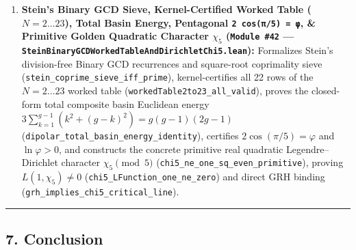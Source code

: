 \documentclass[
  11pt,
]{article}
\begin{document}
\begin{enumerate}
  \(\lambda(s) = |\operatorname{Re}(s) - 1/2| = 0\) across every
  non-trivial zero.
\item
  \textbf{Stein's Binary GCD Sieve, Kernel-Certified Worked Table
  (\(N = 2 \dots 23\)), Total Basin Energy, Pentagonal
  \texttt{2\ cos(π/5)\ =\ φ}, \& Primitive Golden Quadratic Character
  \(\chi_5\) (\texttt{Module\ \#42} ---
  \texttt{SteinBinaryGCDWorkedTableAndDirichletChi5.lean}):} Formalizes
  Stein's division-free Binary GCD recurrences and square-root
  coprimality sieve (\texttt{stein\_coprime\_sieve\_iff\_prime}),
  kernel-certifies all 22 rows of the \(N = 2 \dots 23\) worked table
  (\texttt{workedTable2to23\_all\_valid}), proves the closed-form total
  composite basin Euclidean energy
  \(3\sum_{k=1}^{g-1}(k^2 + (g-k)^2) = g(g-1)(2g-1)\)
  (\texttt{dipolar\_total\_basin\_energy\_identity}), certifies
  \(2\cos(\pi/5) = \varphi\) and \(\ln\varphi > 0\), and constructs the
  concrete primitive real quadratic Legendre--Dirichlet character
  \(\chi_5 \pmod 5\) (\texttt{chi5\_ne\_one\_sq\_even\_primitive}),
  proving \(L(1, \chi_5) \ne 0\)
  (\texttt{chi5\_LFunction\_one\_ne\_zero}) and direct GRH binding
  (\texttt{grh\_implies\_chi5\_critical\_line}).
\end{enumerate}

\begin{center}\rule{0.5\linewidth}{0.5pt}\end{center}

\subsection{7. Conclusion}\label{conclusion}
\end{document}
